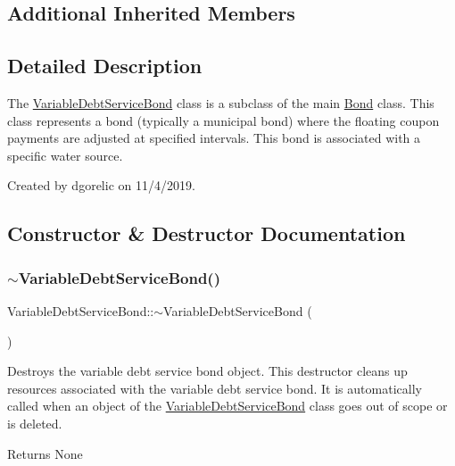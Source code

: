 \subsection*{Additional Inherited Members}


\subsection{Detailed Description}
The {\ttfamily \mbox{\hyperlink{classVariableDebtServiceBond}{Variable\+Debt\+Service\+Bond}}} class is a subclass of the main {\ttfamily \mbox{\hyperlink{classBond}{Bond}}} class. This class represents a bond (typically a municipal bond) where the floating coupon payments are adjusted at specified intervals. This bond is associated with a specific water source. 

Created by dgorelic on 11/4/2019. 

\subsection{Constructor \& Destructor Documentation}
\mbox{\label{classVariableDebtServiceBond_a8259b64265dd9701ac5888e0fe0bc565}} 
\subsubsection{\texorpdfstring{$\sim$\+Variable\+Debt\+Service\+Bond()}{~VariableDebtServiceBond()}}
{\footnotesize\ttfamily Variable\+Debt\+Service\+Bond\+::$\sim$\+Variable\+Debt\+Service\+Bond (\begin{DoxyParamCaption}{ }\end{DoxyParamCaption})\hspace{0.3cm}{\ttfamily [override]}}



Destroys the variable debt service bond object. This destructor cleans up resources associated with the variable debt service bond. It is automatically called when an object of the {\ttfamily \mbox{\hyperlink{classVariableDebtServiceBond}{Variable\+Debt\+Service\+Bond}}} class goes out of scope or is deleted. 

\begin{DoxyReturn}{Returns}
None 
\end{DoxyReturn}



